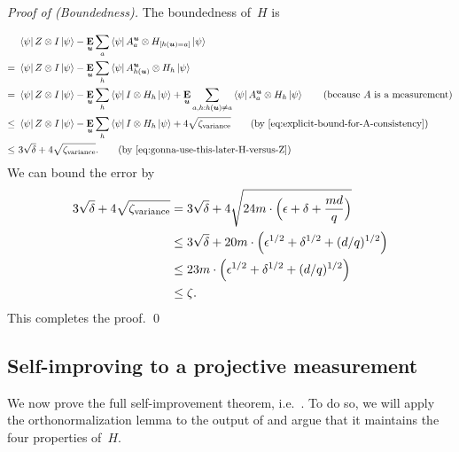 \vspace{\baselineskip}
\noindent
\emph{Proof of  (Boundedness).}
The boundedness of~$H$ is

\begin{align*}
&\bra{\psi} Z \otimes I \ket{\psi} -\E_{\bu} \sum_a \bra{\psi}  A^{\bu}_{a} \otimes H_{[h(\bu)=a]} \ket{\psi} \\
=~&  \bra{\psi} Z \otimes I \ket{\psi} -\E_{\bu} \sum_h \bra{\psi}  A^{\bu}_{h(\bu)} \otimes H_h \ket{\psi}\\
=~&  \bra{\psi} Z \otimes I \ket{\psi} -\E_{\bu} \sum_h \bra{\psi}  I \otimes H_h \ket{\psi} +\E_{\bu} \sum_{a, h:h(\bu)\neq a} \bra{\psi}  A^{\bu}_{a} \otimes H_h \ket{\psi} \tag{because~$A$ is a measurement}\\
\leq~&  \bra{\psi} Z \otimes I \ket{\psi} -\E_{\bu} \sum_h \bra{\psi}  I \otimes H_h \ket{\psi} + 4 \sqrt{\zeta_{\mathrm{variance}}}\tag{by \Cref{eq:explicit-bound-for-A-consistency}}\\
\leq~& 3 \sqrt{\delta} + 4 \sqrt{\zeta_{\mathrm{variance}}}.\tag{by \Cref{eq:gonna-use-this-later-H-versus-Z}}
\end{align*}
We can bound the error by
\begin{align*}
 3 \sqrt{\delta} + 4 \sqrt{\zeta_{\mathrm{variance}}}
 & =  3 \sqrt{\delta} + 4 \sqrt{24m\cdot\Big(\epsilon + \delta + \frac{md}{q}\Big)}\\
 & \leq 3 \sqrt{\delta} + 20 m\cdot\Big(\epsilon^{1/2} + \delta^{1/2} + (d/q)^{1/2}\Big)\\
 &\leq 23 m\cdot\Big(\epsilon^{1/2} + \delta^{1/2} + (d/q)^{1/2}\Big)\\
 & \leq \zeta.
\end{align*}
This completes the proof.
\qed

\subsection{Self-improving to a projective measurement}
\label{sec:self-improvement-projective}

We now prove the full self-improvement theorem, i.e.\ .
To do so, we will apply the orthonormalization lemma 
to the output of  and argue that it maintains the four properties of~$H$.

